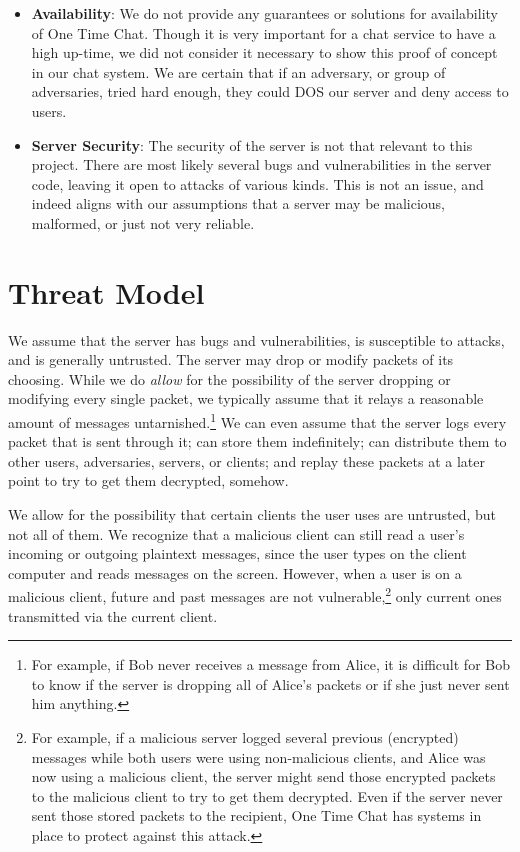 \documentclass[twocolumn]{article}
\begin{document}
\begin{itemize}
\item \textbf{Availability}: We do not provide any guarantees or solutions for availability of One Time Chat. Though it is very important for a chat service to have a high up-time, we did not consider it necessary to show this proof of concept in our chat system. We are certain that if an adversary, or group of adversaries, tried hard enough, they could DOS our server and deny access to users.
\item \textbf{Server Security}: The security of the server is not that relevant to this project. There are most likely several bugs and vulnerabilities in the server code, leaving it open to attacks of various kinds. This is not an issue, and indeed aligns with our assumptions that a server may be malicious, malformed, or just not very reliable.
\end{itemize}

\section{Threat Model}
We assume that the server has bugs and vulnerabilities, is susceptible to attacks, and is generally untrusted. The server may drop or modify packets of its choosing. While we do \emph{allow} for the possibility of the server dropping or modifying every single packet, we typically assume that it relays a reasonable amount of messages untarnished.\footnote{
For example, if Bob never receives a message from Alice, it is difficult for Bob to know if the server is dropping all of Alice's packets or if she just never sent him anything.
}
We can even assume that the server logs every packet that is sent through it; can store them indefinitely; can distribute them to other users, adversaries, servers, or clients; and replay these packets at a later point to try to get them decrypted, somehow.

We allow for the possibility that certain clients the user uses are untrusted, but not all of them. We recognize that a malicious client can still read a user's incoming or outgoing plaintext messages, since the user types on the client computer and reads messages on the screen. However, when a user is on a malicious client, future and past messages are not vulnerable,\footnote{
For example, if a malicious server logged several previous (encrypted) messages while both users were using non-malicious clients, and Alice was now using a malicious client, the server might send those encrypted packets to the malicious client to try to get them decrypted. Even if the server never sent those stored packets to the recipient, One Time Chat has systems in place to protect against this attack.
}
only current ones transmitted via the current client.
\end{document}
